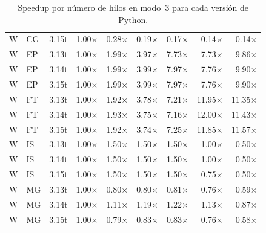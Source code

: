 \begin{table}[htbp]
{\begin{tabular}{lllrrrrrr}
W & CG & 3.15t & 1.00$\times$ & 0.28$\times$ & 0.19$\times$ & 0.17$\times$ & 0.14$\times$ & 0.14$\times$ \\
W & EP & 3.13t & 1.00$\times$ & 1.99$\times$ & 3.97$\times$ & 7.73$\times$ & 7.73$\times$ & 9.86$\times$ \\
W & EP & 3.14t & 1.00$\times$ & 1.99$\times$ & 3.99$\times$ & 7.97$\times$ & 7.76$\times$ & 9.90$\times$ \\
W & EP & 3.15t & 1.00$\times$ & 1.99$\times$ & 3.99$\times$ & 7.97$\times$ & 7.76$\times$ & 9.90$\times$ \\
W & FT & 3.13t & 1.00$\times$ & 1.92$\times$ & 3.78$\times$ & 7.21$\times$ & 11.95$\times$ & 11.35$\times$ \\
W & FT & 3.14t & 1.00$\times$ & 1.93$\times$ & 3.75$\times$ & 7.16$\times$ & 12.00$\times$ & 11.43$\times$ \\
W & FT & 3.15t & 1.00$\times$ & 1.92$\times$ & 3.74$\times$ & 7.25$\times$ & 11.85$\times$ & 11.57$\times$ \\
W & IS & 3.13t & 1.00$\times$ & 1.50$\times$ & 1.50$\times$ & 1.50$\times$ & 1.00$\times$ & 0.50$\times$ \\
W & IS & 3.14t & 1.00$\times$ & 1.50$\times$ & 1.50$\times$ & 1.50$\times$ & 1.00$\times$ & 0.50$\times$ \\
W & IS & 3.15t & 1.00$\times$ & 1.50$\times$ & 1.50$\times$ & 1.50$\times$ & 0.75$\times$ & 0.50$\times$ \\
W & MG & 3.13t & 1.00$\times$ & 0.80$\times$ & 0.80$\times$ & 0.81$\times$ & 0.76$\times$ & 0.59$\times$ \\
W & MG & 3.14t & 1.00$\times$ & 1.11$\times$ & 1.19$\times$ & 1.22$\times$ & 1.13$\times$ & 0.87$\times$ \\
W & MG & 3.15t & 1.00$\times$ & 0.79$\times$ & 0.83$\times$ & 0.83$\times$ & 0.76$\times$ & 0.58$\times$ \\
\hline
\end{tabular}
}
\caption{Speedup por número de hilos en modo~3 para cada versión de Python.}
\label{tab:versiones-mode3-speedups-completos}
\end{table}
